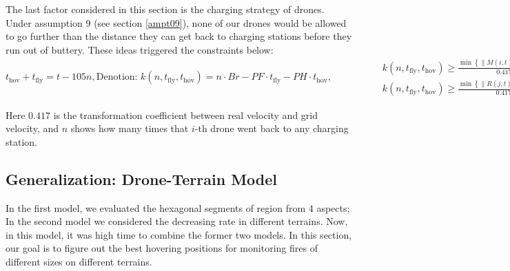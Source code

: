 \documentclass[13pt]{ctexart} %
\begin{document}
The last factor considered in this section is the charging strategy of drones. Under assumption 9 (see section \ref{ampt09}), none of our drones would be allowed to go further than the distance they can get back to charging stations before they run out of buttery. These ideas triggered the constraints below:
\begin{subequations}
    \begin{equation}
        t_{\text{hov}}+t_{\text{fly}}=t-105n,
    \end{equation}
    \begin{equation*}
        \text{Denotion:    }
        k(n, t_{\text{fly}}, t_{\text{hov}}) = n\cdot Br-PF\cdot t_{\text{fly}}-PH\cdot t_{\text{hov}},
    \end{equation*}
    \begin{equation}
        \begin{aligned}
            \qquad\qquad & k(n, t_{\text{fly}}, t_{\text{hov}})
            \geq\frac{\min\left\{\lVert
                M(i,t)-Chg(q)
                \rVert ,q
                \right\}}{
                0.417\cdot V_{\text{max}}
            },
            \ \forall t\forall i,                               \\
                         & k(n, t_{\text{fly}}, t_{\text{hov}})
            \geq\frac{\min\left\{\lVert
                R(j,t)-Chg(q)
                \rVert ,q
                \right\}}{
                0.417\cdot V_{\text{max}}
            },
            \ \forall t\forall j,
        \end{aligned}
    \end{equation}
\end{subequations}

Here $0.417$ is the transformation coefficient between real velocity and grid velocity, and $n$ shows how many times that $i$-th drone went back to any charging station.

\subsection{Generalization: Drone-Terrain Model}
In the first model, we evaluated the hexagonal segments of region from 4 aspects; In the second model we considered the decreasing rate in different terrains. Now, in this model, it was high time to combine the former two models. In this section, our goal is to figure out the best hovering positions for monitoring fires of different sizes on different terrains.
\end{document}
